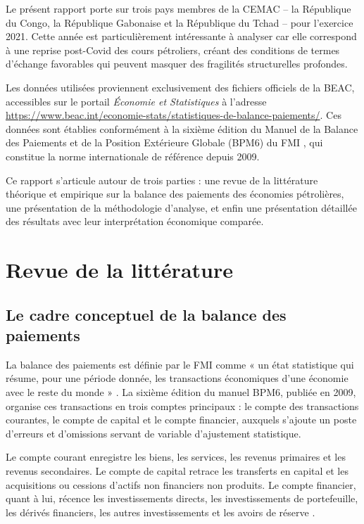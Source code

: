 \documentclass[12pt,a4paper]{article}
\begin{document}
Le présent rapport porte sur trois pays membres de la CEMAC -- la République du Congo, la
République Gabonaise et la République du Tchad -- pour l'exercice 2021. Cette année est
particulièrement intéressante à analyser car elle correspond à une reprise post-Covid des
cours pétroliers, créant des conditions de termes d'échange favorables qui peuvent masquer
des fragilités structurelles profondes.

Les données utilisées proviennent exclusivement des fichiers officiels de la BEAC,
accessibles sur le portail \textit{Économie et Statistiques} à l'adresse
\url{https://www.beac.int/economie-stats/statistiques-de-balance-paiements/}. Ces données
sont établies conformément à la sixième édition du Manuel de la Balance des Paiements et de
la Position Extérieure Globale (BPM6) du FMI \parencite{imf2009bpm6}, qui constitue la
norme internationale de référence depuis 2009.

Ce rapport s'articule autour de trois parties : une revue de la littérature théorique et
empirique sur la balance des paiements des économies pétrolières, une présentation de la
méthodologie d'analyse, et enfin une présentation détaillée des résultats avec leur
interprétation économique comparée.

\section{Revue de la littérature}

\subsection{Le cadre conceptuel de la balance des paiements}

La balance des paiements est définie par le FMI comme « un état statistique qui résume,
pour une période donnée, les transactions économiques d'une économie avec le reste du monde »
\parencite[p.~9]{imf2009bpm6}. La sixième édition du manuel BPM6, publiée en 2009, organise
ces transactions en trois comptes principaux : le compte des transactions courantes, le
compte de capital et le compte financier, auxquels s'ajoute un poste d'erreurs et d'omissions
servant de variable d'ajustement statistique.

Le compte courant enregistre les biens, les services, les revenus primaires et les revenus
secondaires. Le compte de capital retrace les transferts en capital et les acquisitions ou
cessions d'actifs non financiers non produits. Le compte financier, quant à lui, récence
les investissements directs, les investissements de portefeuille, les dérivés financiers,
les autres investissements et les avoirs de réserve \parencite{imf2009bpm6}.
\end{document}
